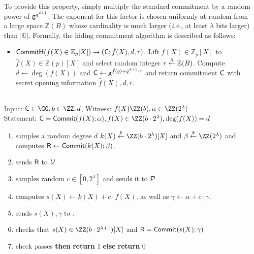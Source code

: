 To provide this property, simply multiply the standard commitment by a random power of $\mathsf{g}^{q^{d+1}}$. The exponent for this factor is chosen uniformly at random from a large space $\mathbb{Z}(B)$ whose cardinality is much larger (\emph{i.e.}, at least $\lambda$ bits larger) than $|\mathbb{G}|$. Formally, the hiding commitment algorithm is described as follows:
\begin{itemize}
	\item $\textsf{{CommitH}}(f(X) \in \mathbb{Z}_p[X]) \rightarrow (\mathsf{C}; \hat{f}(X), d, r)$. Lift $f(X) \in \mathbb{Z}_p[X]$ to $\hat{f}(X) \in \mathbb{Z}(p)[X]$ and select random integer $r \overset{\$}{\gets} \mathbb{Z}(B)$. Compute $d \gets \deg(f(X))$ and $\mathsf{C} \gets \mathsf{g}^{\hat{f}(q)+q^{d+1} \cdot r}$ and return commitment $\mathsf{C}$ with secret opening information $\hat{f}(X), d, r$.
\end{itemize}
 \noindent\begin{mdframed}[userdefinedwidth=\textwidth]
\begin{minipage}{\textwidth}
	\begin{flushleft}
	\\
	Input: $\gr{C} \in \GG,b\in \ZZ,d$, Witness: $f(X) \ZZ(b),\alpha \in \ZZ(2^\lambda)$\\
	Statement: $\gr{C}=\commit(f(X);\alpha),f(X) \in \ZZ(b\cdot 2^\lambda),\deg(f(X))=d$
	\begin{enumerate}[nolistsep]
		    \item \prover samples a random degree $d$ $k(X) \sample \ZZ(b\cdot 2^\lambda)[X]$ and $\beta \sample \ZZ(2^\lambda)$ and computes $\mathsf{R}\gets \textsf{{Commit}}(k(X);\beta)$.
		    \item \prover sends $\mathsf{R}$ to $\mathcal{V}$
		    \item \verifier samples random $c\in [0,2^\lambda]$ and sends it to $\mathcal{P}$
		    \item \prover computes $s(X)\gets k(X) + c \cdot f(X)$, as well as $\gamma\gets \alpha+ c\cdot \gamma$. 
		    \item \prover sends $s(X),\gamma$ to \verifier.
		    \item \verifier checks that $s(X) \in \ZZ(b\cdot 2^{\lambda+1})[X] $ and $\mathsf{R}=\textsf{{Commit}}(s(X);\gamma)$
		    \item \pcif{}check passes \textbf{then} \textbf{return} 1 \textbf{else} \textbf{return} 0
		\end{enumerate}
	\end{flushleft}
\end{minipage}
\end{mdframed}

